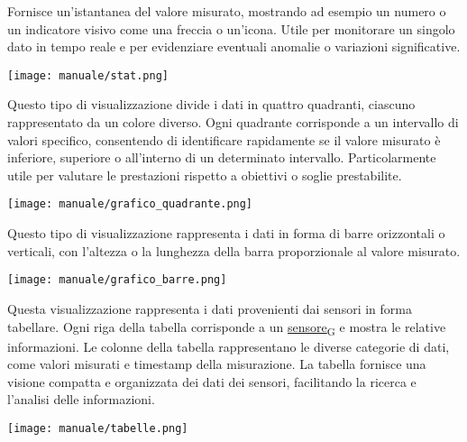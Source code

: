 Fornisce un'istantanea del valore misurato, mostrando ad esempio un numero o un indicatore visivo come una freccia o un'icona. Utile per monitorare un singolo dato in tempo reale e per evidenziare eventuali anomalie o variazioni significative.
\begin{center}
    \texttt{[image: manuale/stat.png]}
\end{center} 

Questo tipo di visualizzazione divide i dati in quattro quadranti, ciascuno rappresentato da un colore diverso. Ogni quadrante corrisponde a un intervallo di valori specifico, consentendo di identificare rapidamente se il valore misurato è inferiore, superiore o all'interno di un determinato intervallo. Particolarmente utile per valutare le prestazioni rispetto a obiettivi o soglie prestabilite.
\begin{center}
    \texttt{[image: manuale/grafico\_quadrante.png]}
\end{center}

Questo tipo di visualizzazione rappresenta i dati in forma di barre orizzontali o verticali, con l'altezza o la lunghezza della barra proporzionale al valore misurato. 
\begin{center}
    \texttt{[image: manuale/grafico\_barre.png]}
\end{center}

Questa visualizzazione rappresenta i dati provenienti dai sensori in forma tabellare. Ogni riga della tabella corrisponde a un \href{https://7last.github.io/docs/pb/documentazione-interna/glossario\#sensore}{sensore\textsubscript{G}} e mostra le relative informazioni. Le colonne della tabella rappresentano le diverse categorie di dati, come valori misurati e timestamp della misurazione. La tabella fornisce una visione compatta e organizzata dei dati dei sensori, facilitando la ricerca e l'analisi delle informazioni.
\begin{center}
    \texttt{[image: manuale/tabelle.png]}
\end{center} 


